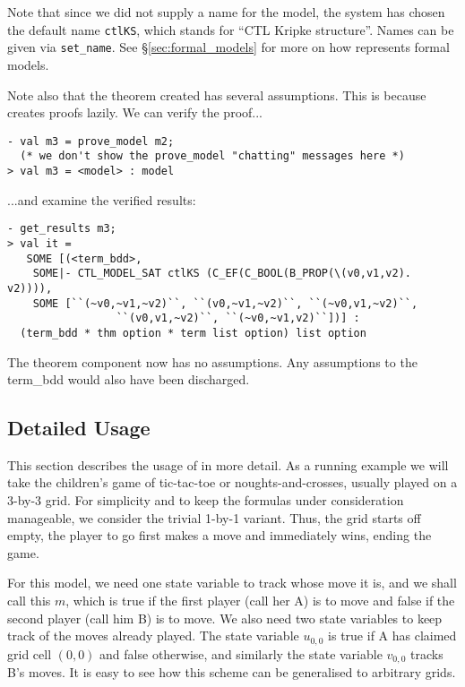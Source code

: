 Note that since we did not supply a name for the model, the system has chosen the default name \texttt{ctlKS}, which stands for ``CTL Kripke structure''. Names can be given via \texttt{set\_name}. See \S\ref{sec:formal_models} for more on how \hc{} represents formal models.

Note also that the theorem created has several assumptions. This is because \hc{}\, creates proofs lazily. We can verify the proof...
\begin{session}\begin{verbatim}
- val m3 = prove_model m2;
  (* we don't show the prove_model "chatting" messages here *)
> val m3 = <model> : model\end{verbatim}\end{session}
...and examine the verified results:
\begin{session}\begin{verbatim}
- get_results m3;
> val it =
   SOME [(<term_bdd>,
    SOME|- CTL_MODEL_SAT ctlKS (C_EF(C_BOOL(B_PROP(\(v0,v1,v2). v2)))),
    SOME [``(~v0,~v1,~v2)``, ``(v0,~v1,~v2)``, ``(~v0,v1,~v2)``,
                 ``(v0,v1,~v2)``, ``(~v0,~v1,v2)``])] :
  (term_bdd * thm option * term list option) list option
\end{verbatim}\end{session}
The theorem component now has no assumptions. Any assumptions to the term\_bdd would also have been discharged.

\subsection{Detailed Usage}

This section describes the usage of \hc{} in more detail. As a running example we will take the children's game of tic-tac-toe or noughts-and-crosses, usually played on a 3-by-3 grid. For simplicity and to keep the formulas under consideration manageable, we consider the trivial 1-by-1 variant. Thus, the grid starts off empty, the player to go first makes a move and immediately wins, ending the game.

For this model, we need one state variable to track whose move it is, and we shall call this \(m\), which is true if the first player (call her A) is to move and false if the second player (call him B) is to move. We also need two state variables to keep track of the moves already played. The state variable \(u_{0,0}\) is true if A has claimed grid cell \((0,0)\) and false otherwise, and similarly the state variable \(v_{0,0}\) tracks B's moves. It is easy to see how this scheme can be generalised to arbitrary grids.

